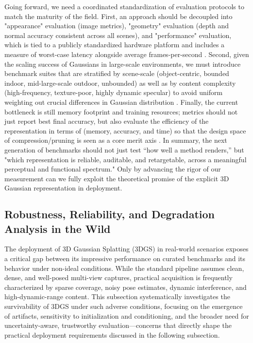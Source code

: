 \documentclass[11pt,a4paper]{article}
\begin{document}
Going forward, we need a coordinated standardization of evaluation protocols to match the maturity of the field. First, an approach should be decoupled into "appearance" evaluation (image metrics), "geometry" evaluation (depth and normal accuracy consistent across all scenes), and "performance" evaluation, which is tied to a publicly standardized hardware platform and includes a measure of worst-case latency alongside average frames-per-second \cite{arxiv:2403.11134v2}. Second, given the scaling success of Gaussians in large-scale environments, we must introduce benchmark suites that are stratified by scene-scale (object-centric, bounded indoor, mid-large-scale outdoor, unbounded) as well as by content complexity (high-frequency, texture-poor, highly dynamic specular) to avoid uniform weighting out crucial differences in Gaussian distribution \cite{arxiv:2406.12080v1}. Finally, the current bottleneck is still memory footprint and training resources; metrics should not just report best final accuracy, but also evaluate the efficiency of the representation in terms of (memory, accuracy, and time) so that the design space of compression/pruning is seen as a core merit axis \cite{arxiv:2504.01844v1}. In summary, the next generation of benchmarks should not just test ``how well a method renders,'' but "which representation is reliable, auditable, and retargetable, across a meaningful perceptual and functional spectrum." Only by advancing the rigor of our measurement can we fully exploit the theoretical promise of the explicit 3D Gaussian representation in deployment.


\subsection{Robustness, Reliability, and Degradation Analysis in the Wild}


The deployment of 3D Gaussian Splatting (3DGS) in real-world scenarios exposes a critical gap between its impressive performance on curated benchmarks and its behavior under non-ideal conditions. While the standard pipeline assumes clean, dense, and well-posed multi-view captures, practical acquisition is frequently characterized by sparse coverage, noisy pose estimates, dynamic interference, and high-dynamic-range content. This subsection systematically investigates the survivability of 3DGS under such adverse conditions, focusing on the emergence of artifacts, sensitivity to initialization and conditioning, and the broader need for uncertainty-aware, trustworthy evaluation---concerns that directly shape the practical deployment requirements discussed in the following subsection.
\end{document}
